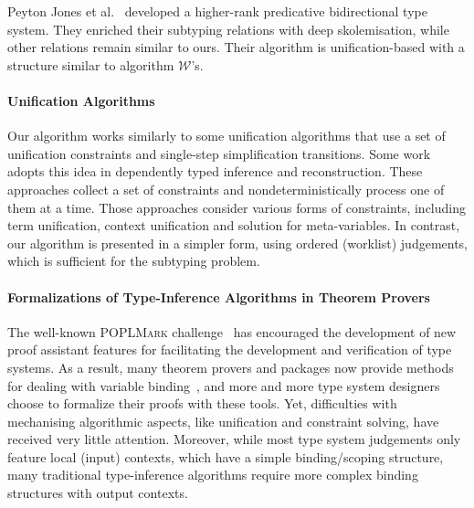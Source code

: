 Peyton Jones et al.~\cite{jones2007practical} developed a higher-rank
predicative bidirectional type system.  They enriched their subtyping relations
with deep skolemisation, while other relations remain similar to ours.  Their
algorithm is unification-based with a structure similar to algorithm
$\mathcal{W}$'s.

\paragraph{Unification Algorithms} Our algorithm works similarly to
some unification algorithms that use a set of unification constraints
and single-step simplification transitions. Some
work~\cite{Reed2009,Abel2011higher} adopts this idea in dependently typed
inference and reconstruction. These approaches collect a set of
constraints and nondeterministically process one of them at a
time. Those approaches consider
various forms of constraints, including term
unification, context unification and solution for meta-variables. In
contrast, our algorithm is presented in a simpler form, using ordered
(worklist) judgements, which is sufficient for the subtyping problem.

\paragraph{Formalizations of Type-Inference Algorithms in Theorem Provers}
The well-known \textsc{POPLMark} challenge~\cite{aydemir2005mechanized} has
encouraged the development of new proof assistant features for facilitating the
development and verification of type systems.
As a result, many theorem provers and packages now provide methods for dealing
with variable binding~\cite{aydemir2008engineering,urban2008nominalTech,chlipala2008parametric},
and more and more type system designers choose to formalize their proofs with these tools.
Yet, difficulties with mechanising algorithmic aspects, like unification and
constraint solving, have received very little attention. Moreover, while most
type system judgements only feature local (input) contexts, which have a simple
binding/scoping structure, many traditional type-inference algorithms require
more complex binding structures with output contexts.

